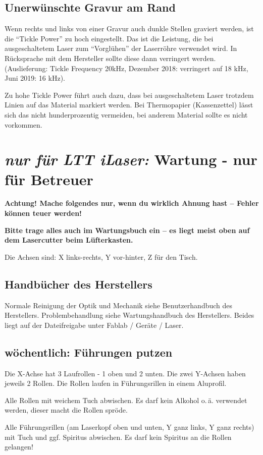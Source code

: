 \documentclass{\basedir/fablab-document}
\newcommand{\nurLTT}{\emph{nur für LTT iLaser:} }
\begin{document}
	\subsection{Unerwünschte Gravur am Rand}
	Wenn rechts und links von einer Gravur auch dunkle Stellen graviert werden, ist die \enquote{Tickle Power} zu hoch eingestellt. Das ist die Leistung, die bei ausgeschaltetem Laser zum \enquote{Vorglühen} der Laserröhre verwendet wird. In Rücksprache mit dem Hersteller sollte diese dann verringert werden. (Auslieferung: Tickle Frequency 20kHz, Dezember 2018: verringert auf 18 kHz, Juni 2019: 16 kHz).

	Zu hohe Tickle Power führt auch dazu, dass bei ausgeschaltetem Laser trotzdem Linien auf das Material markiert werden. Bei Thermopapier (Kassenzettel) lässt sich das nicht hunderprozentig vermeiden, bei anderem Material sollte es nicht vorkommen.


	\section{\nurLTT Wartung - nur für Betreuer}
	\label{sec:wartung-ltt}
	\textbf{Achtung! Mache folgendes nur, wenn du wirklich Ahnung hast -- Fehler können teuer werden!}
	
	\textbf{Bitte trage alles auch im Wartungsbuch ein -- es liegt meist oben auf dem Lasercutter beim Lüfterkasten.}

	Die Achsen sind: X links-rechts, Y vor-hinter, Z für den Tisch.

	\subsection{Handbücher des Herstellers}
	Normale Reinigung der Optik und Mechanik siehe Benutzerhandbuch des Herstellers. Problembehandlung siehe Wartungshandbuch des Herstellers. Beides liegt auf der Dateifreigabe unter Fablab / Geräte / Laser.

	\subsection{wöchentlich: Führungen putzen}
	Die X-Achse hat 3 Laufrollen - 1 oben und 2 unten. Die zwei Y-Achsen haben jeweils 2 Rollen. Die Rollen laufen in Führungsrillen in einem Aluprofil.

	Alle Rollen mit weichem Tuch abwischen. Es darf kein Alkohol o.\,ä. verwendet werden, dieser macht die Rollen spröde.

	Alle Führungsrillen (am Laserkopf oben und unten, Y ganz links, Y ganz rechts) mit Tuch und ggf. Spiritus abwischen. Es darf kein Spiritus an die Rollen gelangen!
\end{document}
